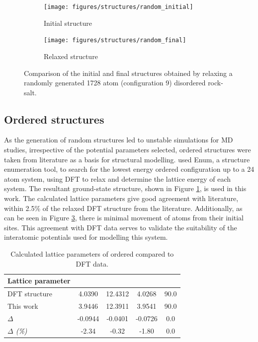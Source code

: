\newpage
\begin{figure}[H]
\centering
 \begin{subfigure}{\textwidth}
 \centering
    \texttt{[image: figures/structures/random\_initial]}
    \caption{Initial structure}
    \label{fig:random_initial}
 \end{subfigure}
  \begin{subfigure}{\textwidth}
   \centering
    \texttt{[image: figures/structures/random\_final]}
    \caption{Relaxed structure}
    \label{fig:random_final}
 \end{subfigure}
\caption{Comparison of the initial and final structures obtained by relaxing a randomly generated 1728 atom (configuration 9)  disordered rock-salt.}
\label{fig:random}
\end{figure}

\newpage
\subsection{Ordered structures}
\label{sec:ordered}
As the generation of random structures led to unstable simulations for MD studies, irrespective of the potential parameters selected, ordered structures were taken from literature as a basis for structural modelling.
\citet{Diaz-Lopez2017} used Enum, a structure enumeration tool, to search for the lowest energy ordered  configuration up to a 24 atom system, using DFT to relax and determine the lattice energy of each system.
The resultant ground-state structure, shown in Figure \ref{fig:random_initial}, is used in this work.
The calculated lattice parameters give good agreement with literature, within 2.5\% of the relaxed DFT structure from the literature.
Additionally, as can be seen in Figure \ref{fig:random}, there is minimal movement of atoms from their initial sites.
This agreement with DFT data serves to validate the suitability of the interatomic potentials used for modelling this system.
\vfill
\begin{table}[h]
\centering
\caption{Calculated lattice parameters of ordered  compared to DFT data.}
\begin{tabular}{lS[table-format=4.4]S[table-format=4.4]S[table-format=4.4]S[table-format=2.1]}
\toprule
\textbf{Lattice parameter} &   &  & &\mc{$\boldsymbol{\alpha} = \boldsymbol{\beta} = \boldsymbol{\gamma}$ (\si{\degree})}\\
\midrule
DFT structure \cite{Diaz-Lopez2017} &  4.0390  & 12.4312 &  4.0268 & 90.0 \\
This work                           &  3.9446  & 12.3911 &  3.9541 & 90.0 \\ 
\textit{$\Delta$}                   & -0.0944  & -0.0401 & -0.0726 &  0.0 \\
\textit{$\Delta$ (\%)}              & -2.34    & -0.32   & -1.80   &  0.0 \\ \bottomrule
\end{tabular}
\end{table}
\vspace{0.25\textheight}

